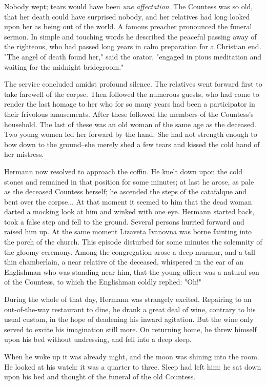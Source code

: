 Nobody wept; tears would have been \emph{une affectation}. The Countess was
so old, that her death could have surprised nobody, and her relatives
had long looked upon her as being out of the world. A famous preacher
pronounced the funeral sermon. In simple and touching words he
described the peaceful passing away of the righteous, who had passed
long years in calm preparation for a Christian end. "The angel of
death found her," said the orator, "engaged in pious meditation and
waiting for the midnight bridegroom."

The service concluded amidst profound silence. The relatives went
forward first to take farewell of the corpse. Then followed the
numerous guests, who had come to render the last homage to her who for
so many years had been a participator in their frivolous amusements.
After these followed the members of the Countess's household. The last
of these was an old woman of the same age as the deceased. Two young
women led her forward by the hand. She had not strength enough to bow
down to the ground--she merely shed a few tears and kissed the cold
hand of her mistress.

Hermann now resolved to approach the coffin. He knelt down upon the
cold stones and remained in that position for some minutes; at last he
arose, as pale as the deceased Countess herself; he ascended the steps
of the catafalque and bent over the corpse... At that moment it seemed
to him that the dead woman darted a mocking look at him and winked
with one eye. Hermann started back, took a false step and fell to the
ground. Several persons hurried forward and raised him up. At the same
moment Lizaveta Ivanovna was borne fainting into the porch of the
church. This episode disturbed for some minutes the solemnity of the
gloomy ceremony. Among the congregation arose a deep murmur, and a
tall thin chamberlain, a near relative of the deceased, whispered in
the ear of an Englishman who was standing near him, that the young
officer was a natural son of the Countess, to which the Englishman
coldly replied: "Oh!"

During the whole of that day, Hermann was strangely excited. Repairing
to an out-of-the-way restaurant to dine, he drank a great deal of
wine, contrary to his usual custom, in the hope of deadening his
inward agitation. But the wine only served to excite his imagination
still more. On returning home, he threw himself upon his bed without
undressing, and fell into a deep sleep.

When he woke up it was already night, and the moon was shining into
the room. He looked at his watch: it was a quarter to three. Sleep had
left him; he sat down upon his bed and thought of the funeral of the
old Countess.

